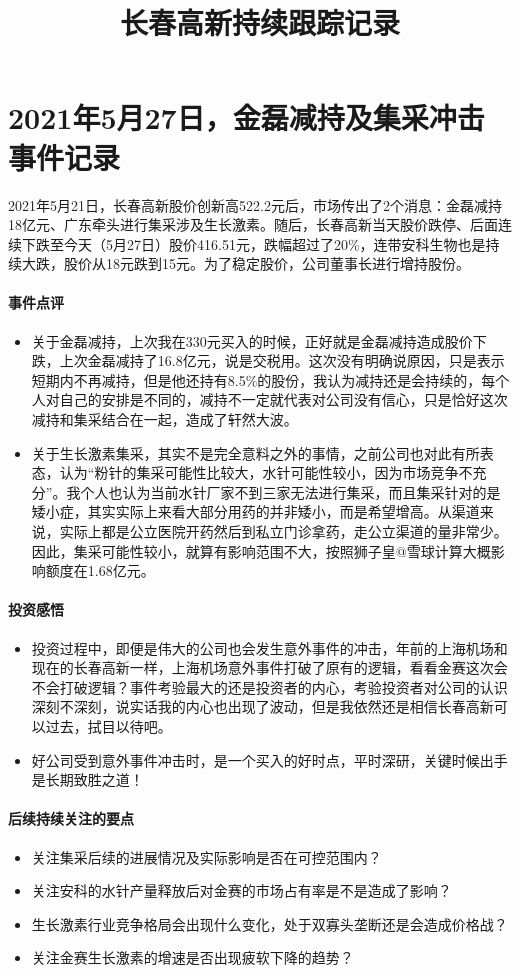 \documentclass[a4paper,12pt,lang=cn,fontset = windows]{elegantpaper} %
\title{长春高新持续跟踪记录} %
\author{}
\date{}
\begin{document}
\maketitle
\section*{2021年5月27日，金磊减持及集采冲击事件记录}
2021年5月21日，长春高新股价创新高522.2元后，市场传出了2个消息：金磊减持18亿元、广东牵头进行集采涉及生长激素。随后，长春高新当天股价跌停、后面连续下跌至今天（5月27日）股价416.51元，跌幅超过了20\%，连带安科生物也是持续大跌，股价从18元跌到15元。为了稳定股价，公司董事长进行增持股份。
\paragraph{事件点评}
\begin{itemize}
    \item 关于金磊减持，上次我在330元买入的时候，正好就是金磊减持造成股价下跌，上次金磊减持了16.8亿元，说是交税用。这次没有明确说原因，只是表示短期内不再减持，但是他还持有8.5\%的股份，我认为减持还是会持续的，每个人对自己的安排是不同的，减持不一定就代表对公司没有信心，只是恰好这次减持和集采结合在一起，造成了轩然大波。
    \item 关于生长激素集采，其实不是完全意料之外的事情，之前公司也对此有所表态，认为“粉针的集采可能性比较大，水针可能性较小，因为市场竞争不充分”。我个人也认为当前水针厂家不到三家无法进行集采，而且集采针对的是矮小症，其实实际上来看大部分用药的并非矮小，而是希望增高。从渠道来说，实际上都是公立医院开药然后到私立门诊拿药，走公立渠道的量非常少。因此，集采可能性较小，就算有影响范围不大，按照狮子皇@雪球计算大概影响额度在1.68亿元。
\end{itemize}
\paragraph{投资感悟}
\begin{itemize}
\item 投资过程中，即便是伟大的公司也会发生意外事件的冲击，年前的上海机场和现在的长春高新一样，上海机场意外事件打破了原有的逻辑，看看金赛这次会不会打破逻辑？事件考验最大的还是投资者的内心，考验投资者对公司的认识深刻不深刻，说实话我的内心也出现了波动，但是我依然还是相信长春高新可以过去，拭目以待吧。
\item 好公司受到意外事件冲击时，是一个买入的好时点，平时深研，关键时候出手是长期致胜之道！
\end{itemize}
\paragraph{后续持续关注的要点}
\begin{itemize}
    \item 关注集采后续的进展情况及实际影响是否在可控范围内？
    \item 关注安科的水针产量释放后对金赛的市场占有率是不是造成了影响？
    \item 生长激素行业竞争格局会出现什么变化，处于双寡头垄断还是会造成价格战？
    \item 关注金赛生长激素的增速是否出现疲软下降的趋势？
    \end{itemize}
\end{document}
